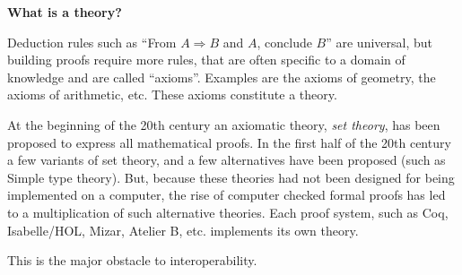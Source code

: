 \begin{framed}
\begin{center}
{\bf \Large What is a theory?}
\end{center}

Deduction rules such as ``From $A \Rightarrow B$ and $A$, conclude
$B$'' are universal, but building proofs require more rules, that are
often specific to a domain of knowledge and are called
``axioms''. Examples are the axioms of geometry, the axioms of
arithmetic, etc. These axioms constitute a theory.

At the beginning of the 20th century an axiomatic theory, {\em set
  theory}, has been proposed to express all mathematical proofs. In
the first half of the 20th century a few variants of set theory, and a
few alternatives have been proposed (such as Simple type theory).
But, because these theories had not been designed for being
implemented on a computer, the rise of computer checked formal proofs
has led to a multiplication of such alternative theories. Each proof system,
such as Coq, Isabelle/HOL, Mizar, Atelier B,
etc. implements its own theory.

This is the major obstacle to interoperability.
\end{framed}

